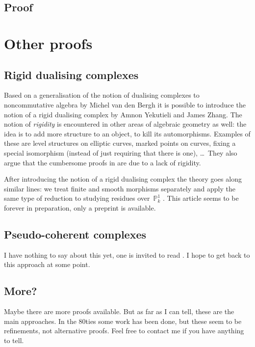 \documentclass[10pt,a4paper]{article}
\begin{document}
\subsection{Proof}
\label{subsection:proof}

\section{Other proofs}
\label{section:other}
\subsection{Rigid dualising complexes}
\label{subsection:yekutieli-zhang}
Based on a generalisation of the notion of dualising complexes to noncommutative algebra \cite{van-den-bergh-dualizing-complexes} by Michel van den Bergh it is possible to introduce the notion of a rigid dualising complex \cite{yekutieli-zhang-rigid-dualizing-complexes} by Amnon Yekutieli and James Zhang. The notion of \emph{rigidity} is encountered in other areas of algebraic geometry as well: the idea is to add more structure to an object, to kill its automorphisms. Examples of these are level structures on elliptic curves, marked points on curves, fixing a special isomorphism (instead of just requiring that there is one), \ldots\ They also argue that the cumbersome proofs in \cite{hartshorne-residues-and-duality} are due to a lack of rigidity.

After introducing the notion of a rigid dualising complex the theory goes along similar lines: we treat finite and smooth morphisms separately and apply the same type of reduction to studying residues over~$\mathbb{P}_k^1$ \cite{yekutieli-zhang-rigid-dualizing-complexes-on-schemes}. This article seems to be forever in preparation, only a preprint is available.

\subsection{Pseudo-coherent complexes}
\label{subsection:lipman}
I have nothing to say about this yet, one is invited to read \cite{lipman-notes-on-grothendieck-duality}. I hope to get back to this approach at some point.

\subsection{More?}
Maybe there are more proofs available. But as far as I can tell, these are the main approaches. In the 80ties some work has been done, but these seem to be refinements, not alternative proofs. Feel free to contact me if you have anything to tell.


\printbibliography
\end{document}
